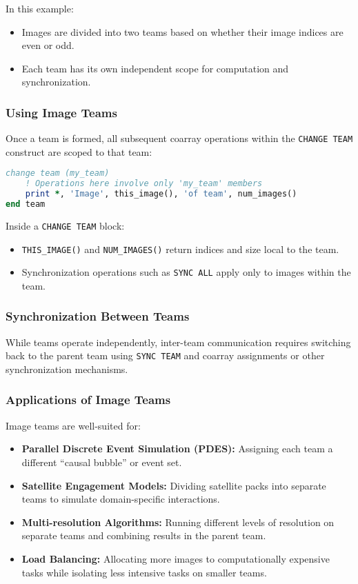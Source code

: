In this example:
\begin{itemize}
    \item Images are divided into two teams based on whether their image indices are even or odd.
    \item Each team has its own independent scope for computation and synchronization.
\end{itemize}

\subsubsection{Using Image Teams}

Once a team is formed, all subsequent coarray operations within the \lstinline{CHANGE TEAM} construct are scoped to that team:
\begin{lstlisting}[language=Fortran, style=fortran, caption={Using image teams}]
change team (my_team)
    ! Operations here involve only 'my_team' members
    print *, 'Image', this_image(), 'of team', num_images()
end team
\end{lstlisting}

Inside a \lstinline{CHANGE TEAM} block:
\begin{itemize}
    \item \lstinline{THIS_IMAGE()} and \lstinline{NUM_IMAGES()} return indices and size local to the team.
    \item Synchronization operations such as \lstinline{SYNC ALL} apply only to images within the team.
\end{itemize}

\subsubsection{Synchronization Between Teams}

While teams operate independently, inter-team communication requires switching back to the parent team using \lstinline{SYNC TEAM} and coarray assignments or other synchronization mechanisms.

\subsubsection{Applications of Image Teams}

Image teams are well-suited for:
\begin{itemize}
    \item \textbf{Parallel Discrete Event Simulation (PDES):} Assigning each team a different ``causal bubble'' or event set.
    \item \textbf{Satellite Engagement Models:} Dividing satellite packs into separate teams to simulate domain-specific interactions.
    \item \textbf{Multi-resolution Algorithms:} Running different levels of resolution on separate teams and combining results in the parent team.
    \item \textbf{Load Balancing:} Allocating more images to computationally expensive tasks while isolating less intensive tasks on smaller teams.
\end{itemize}

